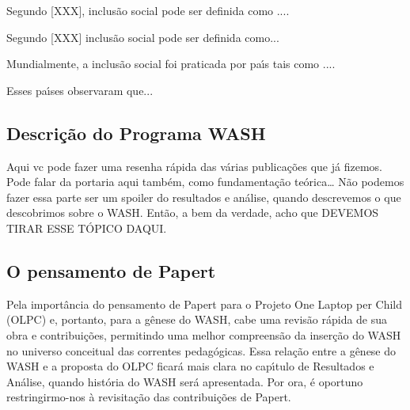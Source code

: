 \documentclass[
12pt,		%
openright,	%
twoside,  %
a4paper,			%
chapter=TITLE,		%
english,			%
french,				%
spanish,			%
brazil				%
]{USPSC-classe/USPSC_RedarTex}
\begin{document}
Segundo [XXX], inclus\~ao social pode ser definida como ....










Segundo [XXX] inclus\~ao social pode ser definida como...










Mundialmente, a inclus\~ao social foi praticada por pa\'{\i}s tais como ....










Esses pa\'{\i}ses observaram que...










\subsection[Descri\c{c}\~ao do Programa WASH]{Descri\c{c}\~ao do Programa WASH}\label{Descri\c{c}\~ao do Programa WASH}
Aqui vc pode fazer uma resenha r\'apida das v\'arias publica\c{c}\~oes que j\'a fizemos. Pode falar da portaria aqui tamb\'em, como fundamenta\c{c}\~ao te\'orica… N\~ao podemos fazer essa parte ser um spoiler do resultados e an\'alise, quando descrevemos o que descobrimos sobre o WASH. Ent\~ao, a bem da verdade, acho que DEVEMOS TIRAR ESSE T\'OPICO DAQUI.










\subsection[O pensamento de Papert]{O pensamento de Papert}\label{O pensamento de Papert}
Pela import\^ancia do pensamento de Papert para o Projeto One Laptop per Child (OLPC) e, portanto, para a g\^enese do WASH, cabe uma revis\~ao r\'apida de sua obra e contribui\c{c}\~oes, permitindo uma melhor compreens\~ao da inser\c{c}\~ao do WASH no universo conceitual das correntes pedag\'ogicas. Essa rela\c{c}\~ao entre a g\^enese do WASH e a proposta do OLPC ficar\'a mais clara no cap\'{\i}tulo de Resultados e An\'alise, quando hist\'oria do WASH ser\'a apresentada. Por ora, \'e oportuno restringirmo-nos \`a revisita\c{c}\~ao das contribui\c{c}\~oes de Papert.
\end{document}
